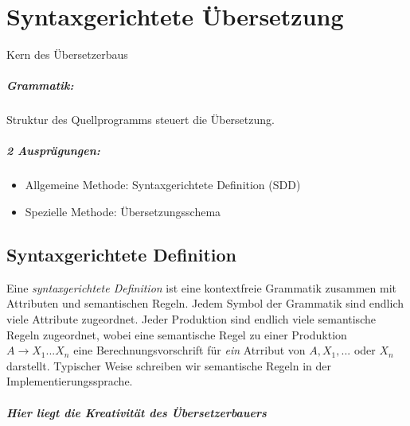 \chapter{Syntaxgerichtete Übersetzung}
Kern des Übersetzerbaus
\paragraph*{Grammatik:} Struktur des Quellprogramms steuert die Übersetzung.
\paragraph*{2 Ausprägungen:}
\begin{itemize}
 \item Allgemeine Methode: Syntaxgerichtete Definition (SDD)
 \item Spezielle Methode: Übersetzungsschema
\end{itemize}

\section{Syntaxgerichtete Definition}
\Defi Eine \emph{syntaxgerichtete Definition} ist eine kontextfreie Grammatik zusammen mit Attributen und semantischen Regeln. Jedem Symbol der Grammatik sind endlich viele Attribute zugeordnet. Jeder Produktion sind endlich viele semantische Regeln zugeordnet, wobei eine semantische Regel zu einer Produktion $A \to X_1 ... X_n$ eine Berechnungsvorschrift für \emph{ein} Atrribut von $A, X_1, ...$ oder $X_n$ darstellt. Typischer Weise schreiben wir semantische Regeln in der Implementierungssprache.
\paragraph*{Hier liegt die Kreativität des Übersetzerbauers}
